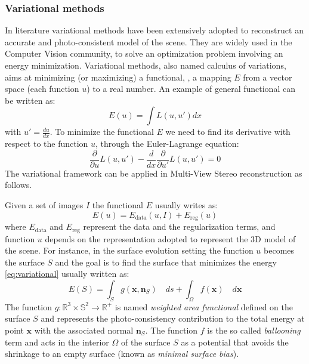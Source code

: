 \subsubsection{Variational methods}
\label{subsec:variational}
In literature variational methods have been extensively adopted to reconstruct an accurate and photo-consistent model of the scene.
 They are widely used in the Computer Vision community, to solve an optimization problem involving an energy minimization.
Variational methods, also named  calculus of variations, aims at minimizing (or maximizing) a functional, \ie, a mapping $E$ from a vector space (each function $u$) to a real number. 
An example of general functional can be written as:
\begin{equation*}
 E(u) = \int \mathit{L} (u, u')dx
\end{equation*}
with $u'=\frac{du}{dx}$.
To minimize the functional $E$ we need to find its derivative with respect to the function $u$, through the Euler-Lagrange equation:
\begin{equation*}
 \frac{\partial}{\partial u} \mathit{L} (u, u') - \frac{d}{dx} \frac{\partial}{\partial u'}\mathit{L} (u, u') =0
\end{equation*}
The variational framework can be applied in Multi-View Stereo reconstruction \cite{hermosillo2002variational} as follows.

Given a set of images $\mathit{I}$ the functional $E$ usually writes as:
\begin{equation}
\label{eq:variational}
E(\mathit{u}) = E_{\text{data}}(\mathit{u}, \mathit{I}) + E_{\text{reg}} (\mathit{u})  
\end{equation}
where $E_{\text{data}}$  and $E_{\text{reg}}$ represent the data and the regularization terms, and function $\mathit{u}$ depends on the representation adopted to represent the 3D model of the scene.
For instance, in the surface evolution setting the function $\mathit{u}$ becomes the surface $\mathit{S}$ and the goal is to find the surface that minimizes the energy \eqref{eq:variational} usually written as:
\begin{equation*}
 E(\mathit{S}) = \int_{\mathit{S}} g(\mathbf{x}, \mathbf{n}_{\mathit{S}}) \quad ds  +\int_{\mathit{\Omega}} f(\mathbf{x}) \quad d\mathbf{x}
\end{equation*}
The function $\mathit{g}:\mathbb{R}^3\times\mathbb{S}^2 \rightarrow \mathbb{R}^+$ is named \emph{weighted area functional}  defined on the surface $\mathit{S}$ and represents the photo-consistency contribution to the total energy at point $\mathbf{x}$ with the associated normal $\mathbf{n}_{\mathit{S}}$.
The function $\mathit{f}$ is the so called \emph{ballooning} term and acts in the interior $\mathit{\Omega}$ of the surface $\mathit{S}$ as a potential that avoids the shrinkage to an empty surface (known as \emph{minimal surface bias}).

